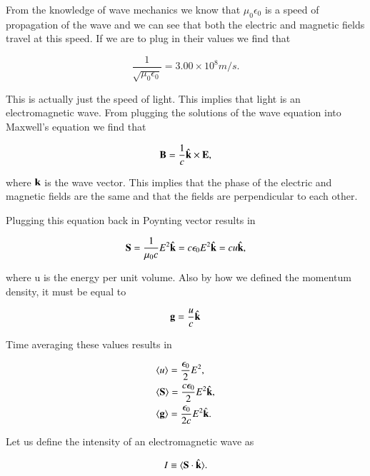 \documentclass[preprint, review,12pt]{elsarticle}
\def\x{\times}
\def\.{\cdot}
\def\b{\textbf}
\def\={\equiv}
\newcommand{\hb}[1]{\hat{\b #1}}
\newcommand{\brak}[1]{\langle #1 \rangle}
\begin{document}
From the knowledge of wave mechanics we know that $\mu_0 \epsilon_0$ is a speed of propagation of the wave and we can see that both the electric and magnetic fields travel at this speed. If we are to plug in their values we find that

\begin{equation}
    \frac{1}{\sqrt{\mu_0 \epsilon_0}} = 3.00 \x 10^8 m/s.
\end{equation}

This is actually just the speed of light. This implies that light is an electromagnetic wave. From plugging the solutions of the wave equation into Maxwell's equation we find that 

\begin{equation}
    \b B = \frac{1}{c} \hb{k} \x \b E,
\end{equation}

where $\b k$ is the wave vector. This implies that the phase of the electric and magnetic fields are the same and that the fields are perpendicular to each other. 

Plugging this equation back in Poynting vector results in

\begin{equation}
    \b S = \frac{1}{\mu_0c}E^2\hb{k} = c\epsilon_0 E^2 \hb{k} = cu \hb{k},
\end{equation}

where u is the energy per unit volume. Also by how we defined the momentum density, it must be equal to 

\begin{equation}
    \b g = \frac{u}{c} \hb{k}
\end{equation}

Time averaging these values results in

\begin{equation}
\begin{split}
    & \brak{u} = \frac{\epsilon_0}{2}E^2, \\
    & \brak{\b S} = \frac{c\epsilon_0}{2}E^2 \hb{k}, \\
    & \brak{\b g} = \frac{\epsilon_0}{2c}E^2 \hb{k}.
\end{split}
\end{equation}

Let us define the intensity of an electromagnetic wave as 

\begin{equation}
    I \= \brak{\b S \. \hb{k}}.
\end{equation}
\end{document}
